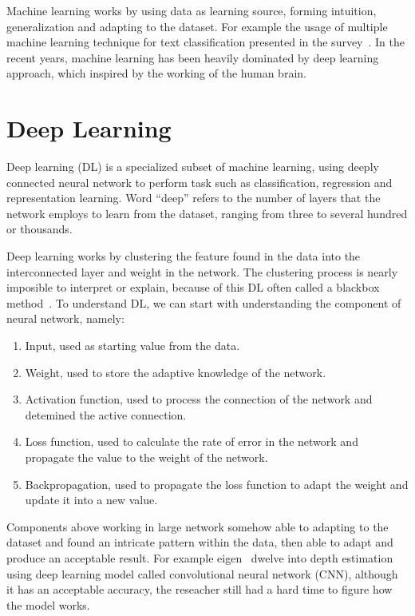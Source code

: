 \documentclass[a4paper,10pt]{article}
\begin{document}
Machine learning works by using data as learning source, forming intuition, generalization and adapting to the dataset.
For example the usage of multiple machine learning technique for text classification presented in the survey~\cite{Rady2024}.
In the recent years, machine learning has been heavily dominated by deep learning approach, which inspired by the working of the human brain.

\section{Deep Learning}

Deep learning (DL) is a specialized subset of machine learning, using deeply connected neural network to perform task such as classification, regression and representation learning.
Word ``deep'' refers to the number of layers that the network employs to learn from the dataset, ranging from three to several hundred or thousands.

Deep learning works by clustering the feature found in the data into the interconnected layer and weight in the network.
The clustering process is nearly imposible to interpret or explain, because of this DL often called a blackbox method~\cite{ibm_ai_comparison}.
To understand DL, we can start with understanding the component of neural network, namely:
\begin{enumerate}
    \item Input, used as starting value from the data.
    \item Weight, used to store the adaptive knowledge of the network.
    \item Activation function, used to process the connection of the network and detemined the active connection.
    \item Loss function, used to calculate the rate of error in the network and propagate the value to the weight of the network.
    \item Backpropagation, used to propagate the loss function to adapt the weight and update it into a new value.
\end{enumerate}

Components above working in large network somehow able to adapting to the dataset and found an intricate pattern within the data, then able to adapt and produce an acceptable result.
For example eigen~\cite{eigen14062283} dwelve into depth estimation using deep learning model called convolutional neural network (CNN), although it has an acceptable accuracy, the reseacher still had a hard time to figure how the model works.
\end{document}
